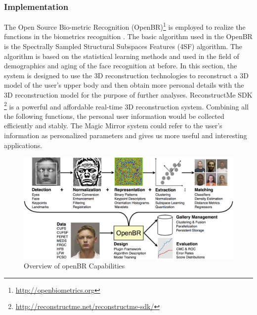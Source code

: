 \subsubsection{Implementation}
The Open Source Bio-metric Recognition (OpenBR)\footnote{\url{http://openbiometrics.org}} is employed to realize the functions in the biometrics recognition \cite{Klontz2013}. The basic algorithm used in the OpenBR is the Spectrally Sampled Structural Subspaces Features (4SF) algorithm. The algorithm is based on the statistical learning methods and used in the field of demographics and aging of the face recognition at before.
In this section, the system is designed to use the 3D reconstruction technologies to reconstruct a 3D model of the user's upper body and then obtain more personal details with the 3D reconstruction model for the purpose of further analyses. ReconstructMe SDK \footnote{\url{http://reconstructme.net/reconstructme-sdk/}} is a powerful and affordable real-time 3D reconstruction system.
Combining all the following functions, the personal user information would be collected efficiently and stably. The Magic Mirror system could refer to the user's information as personalized parameters and gives us more useful and interesting applications.
\begin{figure}
	\centering
	\includegraphics[width=0.7\linewidth]{figures/3-PRMM/OpenBR.png}
	\caption[OpenBR]{Overview of openBR Capabilities}
	\label{fig:3-PRMM:OpenBR}
\end{figure}

